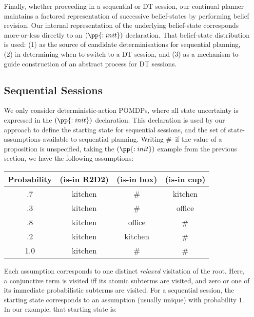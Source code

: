 Finally, whether proceeding in a sequential or DT session, our
continual planner maintains a factored representation of successive
belief-states by performing belief revision. Our internal
representation of the underlying belief-state corresponds more-or-less
directly to an $(\pp{:init})$ declaration. That belief-state
distribution is used: (1) as the source of candidate determinisations
for sequential planning, (2) in determining when to switch to a DT
session, and (3) as a mechanism to guide construction of an abstract
process for DT sessions.

\subsection{Sequential Sessions}

We only consider deterministic-action POMDPs, where all state
uncertainty is expressed in the $(\pp{:init})$ declaration. This
declaration is used by our approach to define the starting state for
sequential sessions, and the set of state-assumptions available to
sequential planning.  Writing \#\ if the value of a proposition is
unspecified, taking the $(\pp{:init})$ example from the previous
section, we have the following assumptions:


\small
\begin{tabular}{cccc}
\hline
Probability & (is-in R2D2)  & (is-in box)  & (is-in cup) \\
\hline
.7 & kitchen & \# &  kitchen\\
.3 & kitchen & \# & office \\
.8 & kitchen & office & \# \\
.2 & kitchen & kitchen & \# \\
1.0 & kitchen & \# & \# \\
\hline
\end{tabular}
\normalsize

\noindent Each assumption corresponds to one distinct {\em
relaxed} visitation of the root. Here, a conjunctive term is visited
iff its atomic subterms are visited, and zero or one of its immediate
probabilistic subterms are visited. For a sequential session, the
starting state corresponds to an assumption (usually unique) with
probability $1$. In our example, that starting state is:

